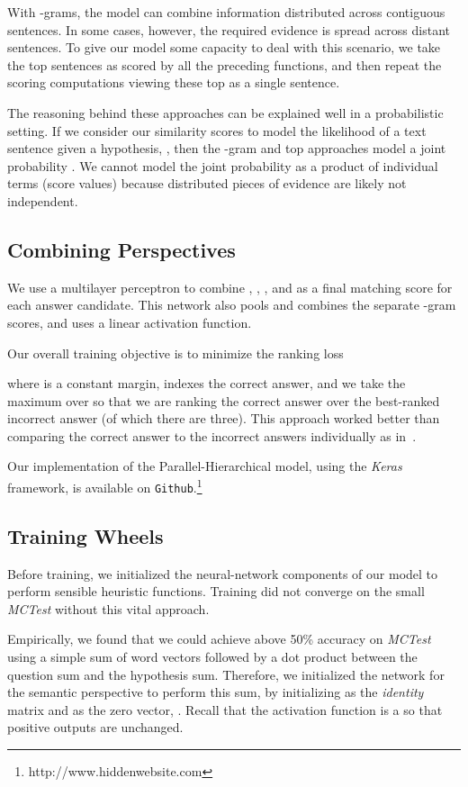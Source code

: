 \documentclass[11pt]{article}
\begin{document}
With -grams, the model can combine information distributed across contiguous sentences. In some cases, however, the required evidence is spread across distant sentences. To give our model some capacity to deal with this scenario, we take the top  sentences as scored by all the preceding functions, and then repeat the scoring computations viewing these top  as a single sentence.

The reasoning behind these approaches can be explained well in a probabilistic setting. If we consider our similarity scores to model the likelihood of a text sentence given a hypothesis, , then the -gram and top  approaches model a joint probability . We cannot model the joint probability as a product of individual terms (score values) because distributed pieces of evidence are likely not independent.

\subsection{Combining Perspectives}
We use a multilayer perceptron to combine , , , and  as a final matching score  for each answer candidate. This network also pools and combines the separate -gram scores, and uses a linear activation function.

Our overall training objective is to minimize the ranking loss

where  is a constant margin,  indexes the correct answer, and we take the maximum over  so that we are ranking the correct answer over the best-ranked incorrect answer (of which there are three). This approach worked better than comparing the correct answer to the incorrect answers individually as in~.

Our implementation of the Parallel-Hierarchical model, using the {\it Keras} framework, is available on \texttt{Github}.\footnote{http://www.hiddenwebsite.com}

\subsection{Training Wheels}
Before training, we initialized the neural-network components of our model to perform sensible heuristic functions. Training did not converge on the small {\it MCTest} without this vital approach.

Empirically, we found that we could achieve above 50\% accuracy on {\it MCTest} using a simple sum of word vectors followed by a dot product between the question sum and the hypothesis sum. Therefore, we initialized the network for the semantic perspective to perform this sum, by initializing  as the {\it identity} matrix and  as the zero vector, . Recall that the activation function is a  so that positive outputs are unchanged.
\end{document}
